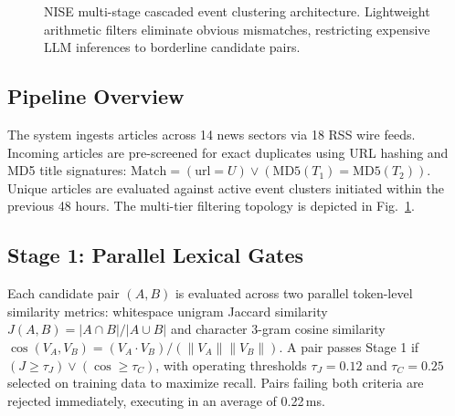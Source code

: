 \documentclass[conference]{IEEEtran}
\begin{document}
\begin{figure}[!t]
\caption{NISE multi-stage cascaded event clustering architecture. Lightweight arithmetic filters eliminate obvious mismatches, restricting expensive LLM inferences to borderline candidate pairs.}
\label{fig:architecture}
\end{figure}

\subsection{Pipeline Overview}
The system ingests articles across 14 news sectors via 18 RSS wire feeds.
Incoming articles are pre-screened for exact duplicates using URL hashing and MD5 title signatures:
$\text{Match} = (\text{url} = U) \lor (\text{MD5}(T_1) = \text{MD5}(T_2))$.
Unique articles are evaluated against active event clusters initiated within the previous 48 hours.
The multi-tier filtering topology is depicted in Fig.~\ref{fig:architecture}.

\subsection{Stage 1: Parallel Lexical Gates}
Each candidate pair $(A, B)$ is evaluated across two parallel token-level similarity metrics:
whitespace unigram Jaccard similarity $J(A, B) = |A \cap B| / |A \cup B|$ and character 3-gram cosine similarity $\cos(V_A, V_B) = (V_A \cdot V_B) / (\|V_A\| \|V_B\|)$.
A pair passes Stage 1 if $(J \ge \tau_J) \lor (\cos \ge \tau_C)$, with operating thresholds $\tau_J = 0.12$ and $\tau_C = 0.25$ selected on training data to maximize recall.
Pairs failing both criteria are rejected immediately, executing in an average of 0.22\,ms.
\end{document}
